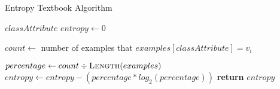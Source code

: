 \begin{algorithm}[H]
\caption{Entropy Textbook Algorithm}\label{a:id3-Entropy-simple}
\begin{algorithmic}[1]
\renewcommand{\algorithmicrequire}{\textbf{Global Vars:}}
\Require $classAttribute$
    \State $entropy \gets 0$

        \State $count \gets$ number of examples that $examples[classAttribute] = v_i$

        \State $percentage \gets count \div \textsc{Length}(examples)$
            \State $entropy \gets entropy - (percentage * log_2 (percentage))$
        \EndIf
    \EndFor
    \State \textbf{return} $entropy$
\EndProcedure
\end{algorithmic}
\end{algorithm}
